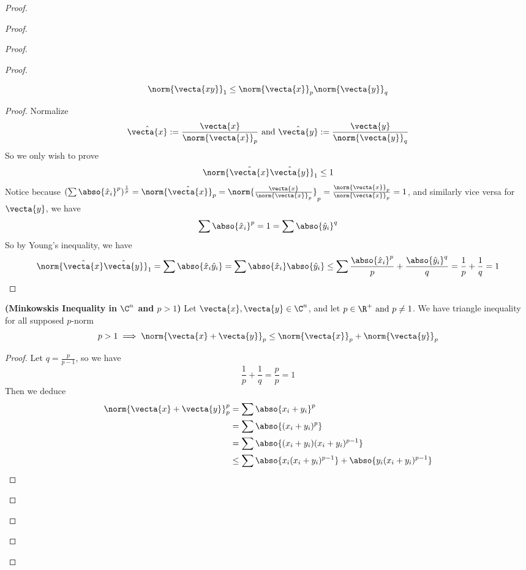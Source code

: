\documentclass{report}
\begin{document}
\begin{proof}
\begin{proof}
\begin{proof}
\begin{proof}
\begin{theorem}
\begin{equation}
\norm{\vecta{xy}}_1\leq \norm{\vecta{x}}_p\norm{\vecta{y}}_q
\end{equation}
\end{theorem}
\begin{proof}
Normalize 
\begin{equation}
\hat{\vecta{x}}:= \frac{\vecta{x}}{\norm{\vecta{x}}_p}\text{ and }\hat{\vecta{y}}:=\frac{\vecta{y}}{\norm{\vecta{y}}_q}
\end{equation}
So we only wish to prove
\begin{equation}
\norm{\hat{\vecta{x}}\hat{\vecta{y}}}_1\leq 1 
\end{equation}
Notice because $(\sum \abso{\hat{x}_i}^p)^{\frac{1}{p}}=\norm{\hat{\vecta{x}}}_p=\norm{\frac{\vecta{x}}{\norm{\vecta{x}}_p}}_p=\frac{\norm{\vecta{x}}_p}{\norm{\vecta{x}}_p}=1$, and similarly vice versa for $\vecta{y}$, we have \begin{equation}
\sum \abso{\hat{x}_i}^p=1=\sum \abso{\hat{y}_i}^q \end{equation} So by Young's inequality, we have \begin{equation} \norm{\hat{\vecta{x}}\hat{\vecta{y}}}_1= \sum \abso{\hat{x }_i\hat{y}_i}=\sum \abso{\hat{x}_i}\abso{\hat{y}_i}\leq \sum \frac{\abso{\hat{x}_i}^p}{p}+\frac{\abso{\hat{y}_i}^q}{q}=\frac{1}{p}+\frac{1}{q}=1
\end{equation}
\end{proof}
\begin{corollary}
\label{8.1.4}
\textbf{(Minkowskis Inequality in $\C^n$ and $p>1$)} Let $\vecta{x},\vecta{y}\in\C^n$, and let $p\in \R^+\text{ and }p\neq 1$. We have triangle inequality for all supposed $p$-norm
\begin{equation}
p>1\implies  \norm{\vecta{x}+\vecta{y}}_p\leq \norm{\vecta{x}}_p+\norm{\vecta{y}}_p
\end{equation}
\end{corollary}
\begin{proof}
Let $q=\frac{p}{p-1}$, so we have
\begin{equation}
\frac{1}{p}+\frac{1}{q}=\frac{p}{p}=1
\end{equation}
Then we deduce 
\begin{align}
  \norm{\vecta{x}+\vecta{y}}_p^p&=\sum \abso{x_i+y_i}^p\\
&= \sum \abso{(x_i+y_i)^{p}}\\
                                &=\sum \abso{(x_i+y_i)(x_i+y_i)^{p-1}}\\
                                &\leq \sum \abso{x_i(x_i+y_i)^{p-1}}+\abso{y_i(x_i+y_i)^{p-1}}\\

\end{align}
\end{proof}
\end{proof}
\end{proof}
\end{proof}
\end{proof}
\end{document}
